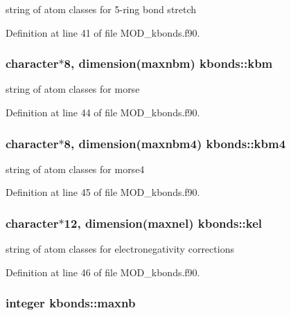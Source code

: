 string of atom classes for 5-\/ring bond stretch 



Definition at line 41 of file M\-O\-D\-\_\-kbonds.\-f90.

\hypertarget{classkbonds_ad0be67fdca802054468f33bcf5a0e7cd}{
\subsubsection[{kbm}]{\setlength{\rightskip}{0pt plus 5cm}character$\ast$8, dimension({\bf maxnbm}) kbonds\-::kbm}}\label{classkbonds_ad0be67fdca802054468f33bcf5a0e7cd}


string of atom classes for morse 



Definition at line 44 of file M\-O\-D\-\_\-kbonds.\-f90.

\hypertarget{classkbonds_a492d22e1290bde1d49114a7d3813342d}{
\subsubsection[{kbm4}]{\setlength{\rightskip}{0pt plus 5cm}character$\ast$8, dimension({\bf maxnbm4}) kbonds\-::kbm4}}\label{classkbonds_a492d22e1290bde1d49114a7d3813342d}


string of atom classes for morse4 



Definition at line 45 of file M\-O\-D\-\_\-kbonds.\-f90.

\hypertarget{classkbonds_a0a98345c9da9fa5108362b927e79036c}{
\subsubsection[{kel}]{\setlength{\rightskip}{0pt plus 5cm}character$\ast$12, dimension({\bf maxnel}) kbonds\-::kel}}\label{classkbonds_a0a98345c9da9fa5108362b927e79036c}


string of atom classes for electronegativity corrections 



Definition at line 46 of file M\-O\-D\-\_\-kbonds.\-f90.

\hypertarget{classkbonds_ae14cb6057f6b902041d325f442bb4eb4}{
\subsubsection[{maxnb}]{\setlength{\rightskip}{0pt plus 5cm}integer kbonds\-::maxnb}}\label{classkbonds_ae14cb6057f6b902041d325f442bb4eb4}


